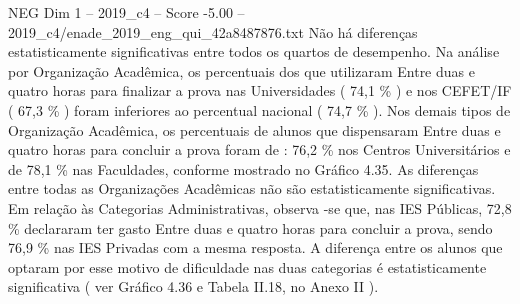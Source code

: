 \begin{textsample}{NEG Dim 1 – 2019\_c4 – Score -5.00 – 2019\_c4/enade\_2019\_eng\_qui\_42a8487876.txt}
Não há diferenças estatisticamente significativas entre todos os quartos de desempenho.
Na análise por Organização Acadêmica, os percentuais dos que utilizaram Entre duas e quatro horas para finalizar a prova nas Universidades ( 74,1 \% ) e nos CEFET/IF ( 67,3 \% ) foram inferiores ao percentual nacional ( 74,7 \% ).
Nos demais tipos de Organização Acadêmica, os percentuais de alunos que dispensaram Entre duas e quatro horas para concluir a prova foram de : 76,2 \% nos Centros Universitários e de 78,1 \% nas Faculdades, conforme mostrado no Gráfico 4.35.
As diferenças entre todas as Organizações Acadêmicas não são estatisticamente significativas.
Em relação às Categorias Administrativas, observa -se que, nas IES Públicas, 72,8 \% declararam ter gasto Entre duas e quatro horas para concluir a prova, sendo 76,9 \% nas IES Privadas com a mesma resposta.
A diferença entre os alunos que optaram por esse motivo de dificuldade nas duas categorias é estatisticamente significativa ( ver Gráfico 4.36 e Tabela II.18, no Anexo II ).

\end{textsample}
